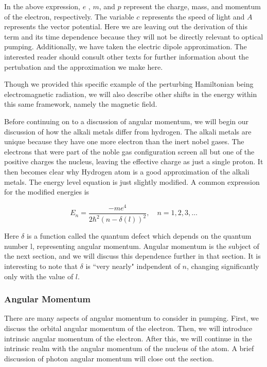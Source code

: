 \documentclass[letter,12pt]{article}
\begin{document}
		In the above expression, $e$ , $m$, and $p$ represent the charge, mass,
		and momentum of the electron, respectively. The variable $c$ represents
		the speed of light and $A$ represents the vector potential. 
		Here we are leaving out the derivation of this term and
		its time dependence because they will not be directly 
		relevant to optical pumping. Additionally, we have taken
		the electric dipole approximation. The interested reader should
		consult other texts for further information about the 
		pertubation and the approximation we make here. 

        Though we provided this specific example of the perturbing 
        Hamiltonian being electromagnetic radiation, we will also 
        describe other shifts in the energy within this same framework,
        namely the magnetic field.

		Before continuing on to a discussion of angular momentum, 
		we will begin our discussion of how the alkali metals differ
		from hydrogen. The alkali metals are unique because they have
        one more electron than the inert nobel gases. 
        The electrons that were part of the noble gas configuration 
        screen all but one of the positive charges the nucleus, leaving the effective
        charge as just a single proton. It then becomes clear why Hydrogen 
        atom is a good approximation of the alkali metals. 
        The energy level equation is just slightly modified. A common
        expression for the modified energies is

		\begin{equation}
            E_n=\frac{-me^4}{2\hbar^2(n-\delta(l))^2},\quad n=1,2,3,...
		\end{equation}

        Here $\delta$ is a function called the quantum defect which
        depends on the quantum number l, representing angular momentum.
        Angular momentum is the subject of the next section, and we 
        will discuss this dependence further in that section.
        It is interesting to note that $\delta$ is ``very nearly"
        indpendent of $n$, changing significantly only with 
        the value of $l$.

		\subsubsection{Angular Momentum}\label{angularMomentum}
		There are many aspects of angular momentum to consider
		in pumping. First, we discuss the orbital angular momentum of 
		the electron. Then, we will introduce intrinsic angular momentum
		of the electron. After this, we will continue in the intrinsic 
		realm with the angular momentum of the nucleus of the atom.
		A brief discussion of photon angular momentum will
		close out the section.
\end{document}
